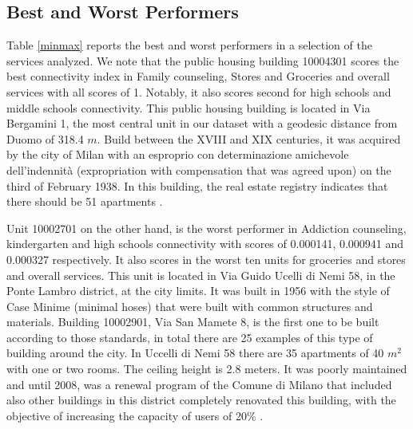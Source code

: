 \documentclass[12pt]{article}
\begin{document}
\subsection{Best and Worst Performers}

Table \ref{minmax} reports the best and worst performers in a selection of the services analyzed. We note that the public housing building 10004301 scores the best connectivity index in Family counseling, Stores and Groceries and overall services with all scores of 1. Notably, it also scores second for high schools and middle schools connectivity. This public housing building is located in Via Bergamini 1, the most central unit in our dataset with a geodesic distance from Duomo of 318.4 $m$. Build between the XVIII and XIX centuries, it was acquired by the city of Milan with an esproprio con determinazione amichevole dell’indennità (expropriation with compensation that was agreed upon) on the third of February 1938. In this building, the real estate registry indicates that there should be 51 apartments \parencite{breda_tua_2016}.

Unit 10002701 on the other hand, is the worst performer in Addiction counseling, kindergarten and high schools connectivity with scores of 0.000141, 0.000941 and 0.000327 respectively. It also scores in the worst ten units for groceries and stores and overall services. This unit is located in Via Guido Ucelli di Nemi 58, in the Ponte Lambro district, at the city limits. It was built in 1956 with the style of Case Minime (minimal hoses) that were built with common structures and materials.  Building 10002901, Via San Mamete 8, is the first one to be built according to those standards, in total there are 25 examples of this type of building around the city. In Uccelli di Nemi 58 there are 35 apartments of 40 $m^2$ with one or two rooms. The ceiling height is 2.8 meters. It was poorly maintained and until 2008, was a renewal program of the Comune di Milano that included also other buildings in this district completely renovated this building, with the objective of increasing the capacity of users of 20\% \parencite{breda_tua_2016}.
\end{document}
